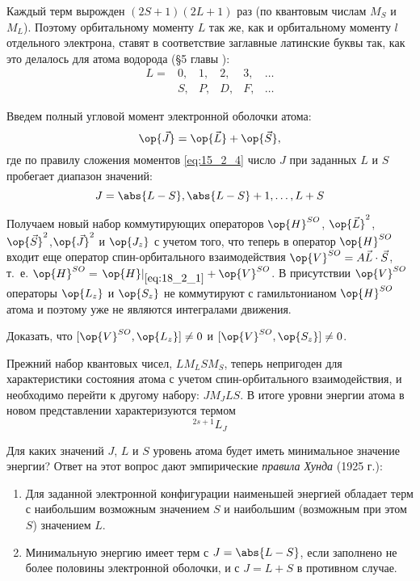 Каждый терм вырожден $(2S+1)(2L+1)$ раз (по квантовым числам $M_S$ и $M_L$). Поэтому орбитальному моменту $L$ так же, как и орбитальному моменту $l$ отдельного электрона, ставят в соответствие заглавные латинские буквы так, как это делалось для атома водорода (\S 5 главы ):
$$ 
\begin{matrix}
L= & 0, & 1, & 2,& 3, & \dots \\
      & S, & P, & D, & F, & \dots 
\end{matrix}
$$

Введем полный угловой момент электронной оболочки атома:
\begin{equation}
\label{eq:18_3_1}
\op{\vec{J}} = \op{\vec{L}} + \op{\vec{S}},
\end{equation}
где по правилу сложения моментов \eqref{eq:15_2_4} число $J$ при заданных $L$ и $S$ пробегает диапазон значений:
$$
J = \abs{L-S}, \abs{L-S} + 1, \dots, L+S
$$

Получаем новый набор коммутирующих операторов $\op{H}^{SO}$, $\op{\vec{L}}^2$, $\op{\vec{S}}^2$,$\op{\vec{J}}^2$ и $\op{J_z}$ с учетом того, что теперь в оператор $\op{H}^{SO}$ входит еще оператор спин-орбитального взаимодействия $\op{V}^{SO} = A \vec{L} \cdot \vec{S}$, т.~е. $\op{H}^{SO} = \left .\op{H} \right |_{\eqref{eq:18_2_1}} + \op{V}^{SO}$. В присутствии $\op{V}^{SO}$ операторы $\op{L_z}$ и $\op{S_z}$ не коммутируют с гамильтонианом $\op{H}^{SO}$ атома и поэтому уже не являются интегралами движения.

\begin{excr}
Доказать, что $[\op{V}^{SO}, \op{L_z}] \neq 0$ и $[\op{V}^{SO}, \op{S_z}] \neq 0$.
\end{excr}

Прежний набор квантовых чисел, $L M_L S M_S$, теперь непригоден для характеристики состояния атома с учетом спин-орбитального взаимодействия, и необходимо перейти к другому набору: $J M_J L S$. В итоге уровни энергии атома в новом представлении характеризуются термом 
$$
\boxed{^{2s+1}L_J}
$$


Для каких значений $J$, $L$ и $S$ уровень атома будет иметь минимальное значение энергии? Ответ на этот вопрос дают эмпирические {\em правила Хунда} (1925 г.):
\begin{enumerate}
\item Для заданной электронной конфигурации наименьшей энергией обладает терм с наибольшим возможным значением $S$ и наибольшим (возможным при этом $S$) значением $L$.
\item Минимальную энергию имеет терм с $J = \abs{L-S}$, если заполнено не более половины электронной оболочки, и с $J = L + S$ в противном случае.
\end{enumerate}

